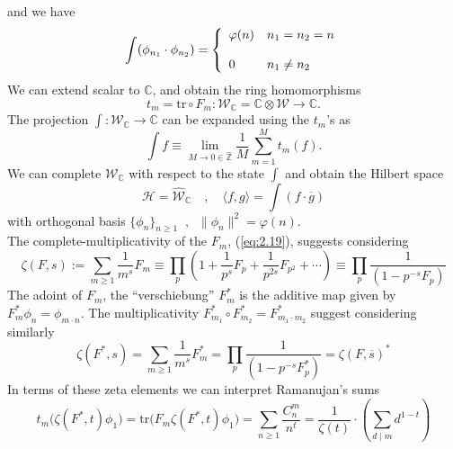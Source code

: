 \documentclass[leqno]{article}
\newcommand{\C}{\mathbb{C}}
\newcommand{\Z}{\mathbb{Z}}
\numberwithin{equation}{section}
\begin{document}
and we have
\begin{equation}
  \label{eq:12.32}
  \int (\phi_{n_1}\cdot \phi_{n_2}) =
\left\{  \begin{array}[h]{ll}
           \varphi(n) & n_1=n_2=n \\\\
           0 & n_1\not= n_2
  \end{array}\right. 
\end{equation}
We can extend scalar to $\C$, and obtain the ring homomorphisms
\begin{equation}
  \label{eq:12.33}
  t_m=\text{tr}\circ F_m: \mathcal{W}_{\C}=\C\otimes \mathcal{W}\longrightarrow \C. 
\end{equation}
The projection $\int: \mathcal{W}_{\C}\rightarrow \C$ can be expanded using the $t_m$'s as
\begin{equation}
  \label{eq:12.34}
  \int f \equiv \lim_{M\to 0\in \hat{\Z}}\frac{1}{M}\sum_{m=1}^M t_m(f).
\end{equation}
We can complete $\mathcal{W}_{\C}$ with respect to the state $\int$ and obtain the Hilbert space
\begin{equation}
  \label{eq:12.35}
  \mathcal{H} = \hat{\mathcal{W}}_{\C}\quad, \quad \langle f,g\rangle = \int (f\cdot \overline{g})
\end{equation}
with orthogonal basis $\{\phi_n\}_{n\ge 1}\;\; , \;\; \|\phi_n\|^2=\varphi(n)$. \\
The complete-multiplicativity of the $F_m$, (\ref{eq:2.19}), suggests considering
  \begin{equation}
    \label{eq:12.36}
    \zeta (F,s):= \sum_{m\ge 1}\frac{1}{m^s} F_m\equiv \prod_p\left(1+\frac{1}{p^s}F_p+\frac{1}{p^{2s}}F_{p^2}+\cdots\right)\equiv
      \prod_p \frac{1}{(1-p^{-s}F_p)}
    \end{equation}
    The adoint of $F_m$, the ``verschiebung'' $F_m^\ast$ is the
    additive map given by \break  $F_m^\ast\phi_n=\phi_{m\cdot n}$. The
    multiplicativity $F^\ast_{m_1}\circ F_{m_2}^\ast=F_{m_1\cdot m_2}^{\ast}$ suggest considering similarly
    \begin{equation}
      \label{eq:12.37}
      \zeta(F^{\ast},s)=\sum\limits_{m\ge 1}\frac{1}{m^s}F_m^{\ast} = \prod_p \frac{1}{(1-p^{-s}F_p^{\ast})}=\zeta(F,\overline{s})^{\ast}
    \end{equation} 
    In terms of these zeta elements we can interpret
    Ramanujan's sums
\begin{equation}
  \label{eq:12.38}
  t_m\big(\zeta(F^{\ast},t)\phi_1\big) = \text{tr}\big(F_m\zeta(F^{\ast},t)\phi_1\big) = \sum_{n\ge 1}\frac{C_n^m}{n^t} = \frac{1}{\zeta(t)}\cdot\left(
    \sum_{d\mid m}d^{1-t}\right) 
\end{equation}
\end{document}
